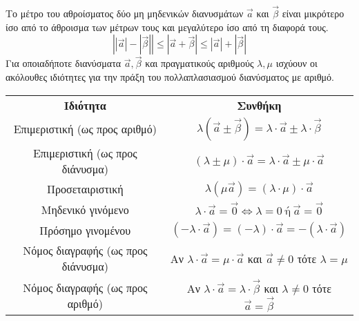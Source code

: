 \documentclass[twoside,nofonts,internet,shmeiwseis]{thewria}
\begin{document}
\vspace{3mm}
\mbox{}\\\\\\
\newpage\noindent
{}
Το μέτρο του αθροίσματος δύο μη μηδενικών διανυσμάτων $ \vec{a} $ και $ \vec{\beta} $ είναι μικρότερο ίσο από το άθροισμα των μέτρων τους και μεγαλύτερο ίσο από τη διαφορά τους.
\[ \left||\vec{a}|-|\vec{\beta}| \right| \leq\left|\vec{a}+\vec{\beta}\right|\leq|\vec{a}|+|\vec{\beta}|  \]
Για οποιαδήποτε διανύσματα $ \vec{a},\vec{\beta} $ και πραγματικούς αριθμούς $ \lambda,\mu $ ισχύουν οι ακόλουθες ιδιότητες για την πράξη του πολλαπλασιασμού διανύσματος με αριθμό.
\begin{center}
\begin{longtable}{cc}
\hline \rule[-2ex]{0pt}{5.5ex} \textbf{Ιδιότητα} & \textbf{Συνθήκη} \\ 
\hhline{==} \rule[-2ex]{0pt}{5.5ex} Επιμεριστική (ως προς αριθμό) & $ \lambda\left( \vec{a}\pm\vec{\beta}\right)=\lambda\cdot\vec{a}\pm\lambda\cdot\vec{\beta} $ \\ 
\rule[-2ex]{0pt}{5.5ex} Επιμεριστική (ως προς διάνυσμα) & $ \left( \lambda\pm\mu\right)\cdot\vec{a}=\lambda\cdot\vec{a}\pm\mu\cdot\vec{a} $ \\
\rule[-2ex]{0pt}{5.5ex} Προσεταιριστική & $ \lambda\left( \mu\vec{a}\right)=\left( \lambda\cdot\mu\right)\cdot\vec{a} $ \\ 
\rule[-2ex]{0pt}{5.5ex} Μηδενικό γινόμενο & $ \lambda\cdot\vec{a}=\vec{0}\Leftrightarrow \lambda=0 \ \textrm{ή}\ \vec{a}=\vec{0} $ \\ 
\rule[-2ex]{0pt}{5.5ex} Πρόσημο γινομένου & $ \left( -\lambda\cdot\vec{a}\right)=(-\lambda)\cdot\vec{a}=-\left( \lambda\cdot\vec{a}\right)  $ \\ 
\rule[-2ex]{0pt}{5.5ex} Νόμος διαγραφής (ως προς διάνυσμα) & Αν $ \lambda\cdot\vec{a}=\mu\cdot\vec{a} $ και $ \vec{a}\neq0 $ τότε $ \lambda=\mu $ \\ 
\rule[-2ex]{0pt}{5.5ex} Νόμος διαγραφής (ως προς αριθμό) & Αν $ \lambda\cdot\vec{a}=\lambda\cdot\vec{\beta} $ και $ \lambda\neq0 $ τότε $ \vec{a}=\vec{\beta} $\\ 
\hline 
\end{longtable}
\end{center} 
\end{document}
